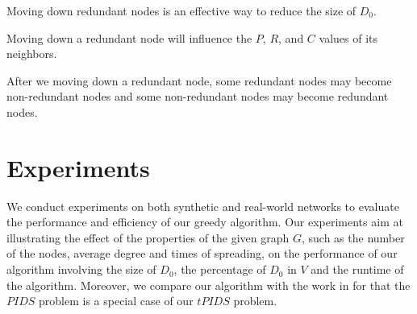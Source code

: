 Moving down redundant nodes is an effective way to reduce the size of $D_0$.
\begin{theorem}
	Moving down a redundant node will influence the $P$, $R$, and $C$ values of its neighbors.
\end{theorem}
\begin{theorem}
	After we moving down a redundant node, some redundant nodes may become non-redundant nodes and some non-redundant nodes may become redundant nodes.
\end{theorem}
\section{Experiments}
We conduct experiments on both synthetic and real-world networks to evaluate the performance and efficiency of our greedy algorithm. Our experiments aim at illustrating the effect of the properties of the given graph $G$, such as the number of the nodes, average degree and times of spreading, on the performance of our algorithm involving the size of $D_0$, the percentage of $D_0$ in $V$ and the runtime of the algorithm. Moreover, we compare our algorithm with the work in \cite{WDC2011} for that the $PIDS$ problem is a special case of our $tPIDS$ problem.
